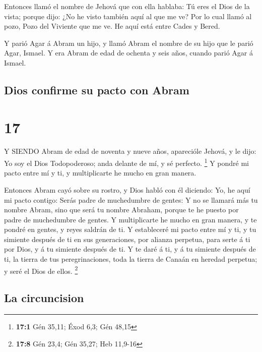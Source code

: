  Entonces llamó el nombre de Jehová que con ella hablaba:
Tú eres el Dios de la vista; porque dijo: ¿No he visto también aquí al
que me ve?  Por lo cual llamó al pozo, Pozo del Viviente
que me ve. He aquí está entre Cades y Bered.

 Y parió Agar á Abram un hijo, y llamó Abram el nombre de
su hijo que le parió Agar, Ismael.  Y era Abram de edad de
ochenta y seis años, cuando parió Agar á Ismael.

\hypertarget{dios-confirme-su-pacto-con-abram}{%
\subsection{Dios confirme su pacto con
Abram}\label{dios-confirme-su-pacto-con-abram}}

\hypertarget{section-16}{%
\section{17}\label{section-16}}

 Y SIENDO Abram de edad de noventa y nueve años, aparecióle
Jehová, y le dijo: Yo soy el Dios Todopoderoso; anda delante de mí, y sé
perfecto. \footnote{\textbf{17:1} Gén 35,11; Éxod 6,3; Gén 48,15}
 Y pondré mi pacto entre mí y ti, y multiplicarte he mucho
en gran manera.

 Entonces Abram cayó sobre su rostro, y Dios habló con él
diciendo:  Yo, he aquí mi pacto contigo: Serás padre de
muchedumbre de gentes:  Y no se llamará más tu nombre Abram,
sino que será tu nombre Abraham, porque te he puesto por padre de
muchedumbre de gentes.  Y multiplicarte he mucho en gran
manera, y te pondré en gentes, y reyes saldrán de ti.  Y
estableceré mi pacto entre mí y ti, y tu simiente después de ti en sus
generaciones, por alianza perpetua, para serte á ti por Dios, y á tu
simiente después de ti.  Y te daré á ti, y á tu simiente
después de ti, la tierra de tus peregrinaciones, toda la tierra de
Canaán en heredad perpetua; y seré el Dios de ellos. \footnote{\textbf{17:8}
  Gén 23,4; Gén 35,27; Heb 11,9-16}

\hypertarget{la-circuncision}{%
\subsection{La circuncision}\label{la-circuncision}}

